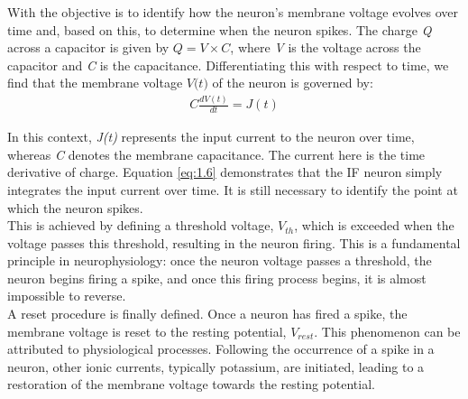 \noindent With the objective is to identify how the neuron's membrane voltage evolves over time and, based on this, to determine when the neuron spikes. The charge \textit{Q} across a capacitor is given by $Q = V \times C$, where \textit{V} is the voltage across the capacitor and \textit{C} is the capacitance. Differentiating this with respect to time, we find that the membrane voltage $\textit{V(t)}$ of the neuron is governed by:
\begin{align}
    C \frac{dV(t)}{dt} = J(t) \label{eq:1.6} 
\end{align}

\noindent In this context, \textit{J(t)} represents the input current to the neuron over time, whereas \textit{C} denotes the membrane capacitance. The current here is the time derivative of charge. Equation \ref{eq:1.6} demonstrates that the IF neuron simply integrates the input current over time. It is still necessary to identify the point at which the neuron spikes. \\

\noindent This is achieved by defining a threshold voltage, $V_{th}$, which is exceeded when the voltage passes this threshold, resulting in the neuron firing. This is a fundamental principle in neurophysiology: once the neuron voltage passes a threshold, the neuron begins firing a spike, and once this firing process begins, it is almost impossible to reverse. \\

\noindent A reset procedure is finally defined. Once a neuron has fired a spike, the membrane voltage is reset to the resting potential, $V_{rest}$. This phenomenon can be attributed to physiological processes. Following the occurrence of a spike in a neuron, other ionic currents, typically potassium, are initiated, leading to a restoration of the membrane voltage towards the resting potential.\\


